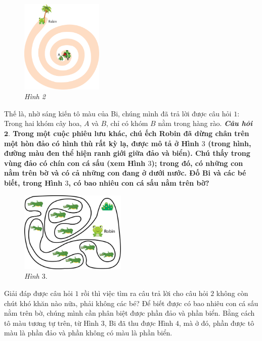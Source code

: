 	\begin{figure}[H]
		\centering
		\captionsetup{labelformat= empty, justification=centering}
		\includegraphics[width=0.35\textwidth]{2}
		\caption{\small\textit{Hình 2}}
		\vspace*{-15pt}
	\end{figure}
 	Thế là, nhờ sáng kiến tô màu của Bi, chúng  mình đã trả lời được câu hỏi $1$: Trong hai khóm cây hoa, $A$ và $B$, chỉ có khóm $B$ nằm trong hàng rào.
	\vskip 0.1cm
	\textbf{\textit{Câu hỏi $\pmb{2.}$} {\color{abc}Trong một cuộc phiêu lưu khác, chú ếch Robin đã dừng chân trên một hòn đảo có hình thù rất kỳ lạ, được mô tả ở Hình $3$ (trong hình, đường màu đen thể hiện ranh giới giữa đảo và biển). Chú thấy trong vùng đảo có chín con cá sấu (xem Hình $3$); trong đó, có những con nằm trên bờ và có cả những con đang ở dưới nước. Đố Bi và các bé biết, trong Hình $3$, có bao nhiêu con cá sấu nằm trên bờ?}}
	\begin{figure}[H]
		\centering
		\vspace*{-10pt}
		\captionsetup{labelformat= empty, justification=centering}
		\includegraphics[width=0.45\textwidth]{pic12}
		\caption{\small\textit{Hình $3.$}}
		\vspace*{-10pt}
	\end{figure}
	Giải đáp được câu hỏi $1$ rồi thì việc tìm ra câu trả lời cho câu hỏi $2$ không còn chút khó khăn nào nữa, phải không các bé?
	\vskip 0.1cm
	Để biết được có bao nhiêu con cá sấu nằm trên bờ, chúng mình cần phân biệt được phần đảo và phần biển. Bằng cách tô màu tương tự trên, từ Hình $3$, Bi đã thu được Hình $4$, mà ở đó, phần được tô màu là phần đảo và phần không có màu là phần biển.
